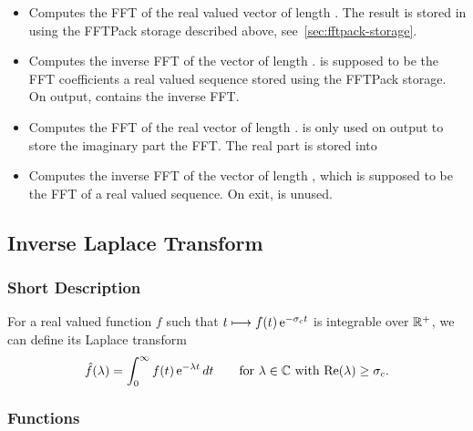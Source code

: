 \begin{itemize}
\item {}
  \sshortdescribe Computes the FFT of the real valued vector  of
  length . The result is stored in  using the FFTPack storage
  described above, see~\ref{sec:fftpack-storage}.

\item {}
  \sshortdescribe Computes the inverse FFT of the vector  of length
  .  is supposed to be the FFT coefficients a real valued
  sequence stored using the FFTPack storage. On output,  contains
  the inverse FFT.

\item {}
  \sshortdescribe Computes the FFT of the real vector  of length .
   is only used on output to store the imaginary part the FFT. The
  real part is stored into 

\item {}
  \sshortdescribe Computes the inverse FFT of the vector  of
  length , which is supposed to be the FFT of a real valued
  sequence. On exit,  is unused.
\end{itemize}

\subsection{Inverse Laplace Transform}
\subsubsection{Short Description}

For a real valued function $f$ such that $t \longmapsto f(t) \operatorname{e}^{ - \sigma_c
  t }$ is integrable over ${\mathbb R}^+$, we can define its Laplace transform
\begin{equation*}
  \hat{f}(\lambda) = \int_0^\infty f(t) \operatorname{e}^{ - \lambda t } dt \qquad
  \mbox{for $\lambda \in {\mathbb C}$ with $\operatorname{Re}(\lambda) \ge \sigma_c$}.
\end{equation*}

\subsubsection{Functions}

